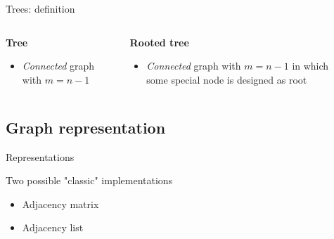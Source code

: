 \documentclass[compress]{beamer}
\begin{document}
\begin{frame}{Trees: definition}
  \begin{columns}
    \begin{block}{\textbf{Tree}}
      \begin{itemize}
      \item \emph{Connected} graph with $m = n - 1$
      \end{itemize}
    \end{block}
    \begin{center}
    \scalebox{0.7}{}
    \end{center}
    \begin{block}{\textbf{Rooted tree}}
      \begin{itemize}
      \item \emph{Connected} graph with $m = n - 1$ in which some special node is designed as root
      \end{itemize}
    \end{block}
    \begin{center}
    \scalebox{0.8}{}
    \end{center}
  \end{columns}
\end{frame}

\subsection{Graph representation}

\begin{frame}{Representations}
  \begin{block}{}
    Two possible "classic" implementations
  \end{block}
  \begin{itemize}
    \item Adjacency matrix
    \item Adjacency list
  \end{itemize}
\end{frame}
\end{document}
